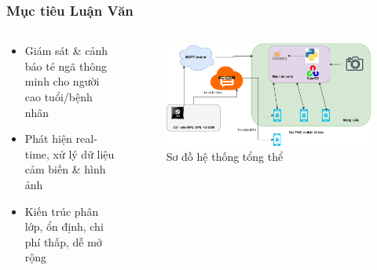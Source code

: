 \begin{frame}
    \frametitle{Mục tiêu Luận Văn}
    \begin{columns}[T]
        \begin{column}{0.48\textwidth}
            \begin{itemize}
                \item Giám sát \& cảnh báo té ngã thông minh cho người cao tuổi/bệnh nhân
                \item Phát hiện real-time, xử lý dữ liệu cảm biến \& hình ảnh
                \item Kiến trúc phân lớp, ổn định, chi phí thấp, dễ mở rộng
            \end{itemize}
        \end{column}
        \begin{column}{0.48\textwidth}
            \begin{figure}
                \centering
                \includegraphics[width=\textwidth]{images/resuilt_structure_diagram.pdf}
                \caption{Sơ đồ hệ thống tổng thể}
            \end{figure}
        \end{column}
    \end{columns}
\end{frame}

